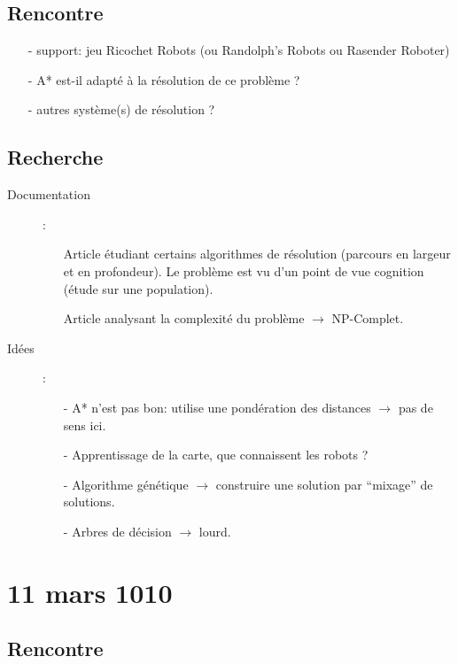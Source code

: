 \documentclass[a4paper,10pt]{article}
\begin{document}
\subsection{Rencontre}
\begin{itemize}
  \item[-]support: jeu Ricochet Robots (ou Randolph's Robots ou Rasender
Roboter)
  \item[-]A* est-il adapté à la résolution de ce problème ?
  \item[-]autres système(s) de résolution ?
\end{itemize}

\subsection{Recherche}

\begin{description}

  \item[Documentation]:
    \begin{itemize}
      \item[\cite{HMP}]Article étudiant certains algorithmes de résolution (parcours en largeur et en
    profondeur). Le problème est vu d'un point de vue cognition (étude sur une population).
      \item[\cite{NPC}]Article analysant la complexité du problème $\rightarrow$ NP-Complet.
    \end{itemize}

  \item[Idées]:
    \begin{itemize}
      \item[-]A* n'est pas bon: utilise une pondération des distances $\rightarrow$ pas de sens ici.
      \item[-]Apprentissage de la carte, que connaissent les robots ?
      \item[-]Algorithme génétique $\rightarrow$ construire une solution par ``mixage'' de solutions.
      \item[-]Arbres de décision $\rightarrow$ lourd.
    \end{itemize}

\end{description}

\section{11 mars 1010}
\subsection{Rencontre}
\end{document}

